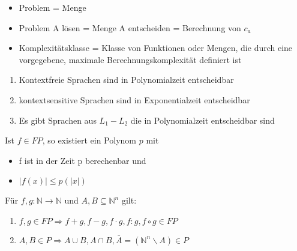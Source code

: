 \documentclass[14pt]{article}
\begin{document}
\begin{eigenschaft}[Terminologie]
    \begin{itemize}
        \item Problem = Menge
        \item Problem A lösen = Menge A entscheiden = Berechnung von $c_a$
        \item Komplexitätsklasse = Klasse von Funktionen oder Mengen, die durch 
        eine vorgegebene, maximale Berechnungskomplexität definiert ist
    \end{itemize}
\end{eigenschaft}
\begin{eigenschaft}
    \begin{enumerate}
        \item Kontextfreie Sprachen sind in Polynomialzeit entscheidbar
        \item kontextsensitive Sprachen sind in Exponentialzeit entscheidbar
        \item Es gibt Sprachen aus $L_1 - L_2$ die in Polynomialzeit entscheidbar sind
    \end{enumerate}
\end{eigenschaft}
\begin{eigenschaft}
    Ist $f \in FP$, so existiert ein Polynom $p$ mit 
    \begin{itemize}
        \item f ist in der Zeit p berechenbar und
        \item $|f(x)| \leq p(|x|)$
    \end{itemize}
\end{eigenschaft}
\begin{eigenschaft}
    Für $f, g : \mathbb{N} \rightarrow \mathbb{N}$ und $A, B \subseteq \mathbb{N}^n$ gilt:
    \begin{enumerate}
        \item $f, g \in FP \Rightarrow f + g, f - g, f \cdot g, f : g, f \circ g \in FP$
        \item $A, B \in P \Rightarrow A \cup B, A \cap B, \bar{A} = (\mathbb{N}^n \backslash A) \in P$
    \end{enumerate}
\end{eigenschaft}
\end{document}
